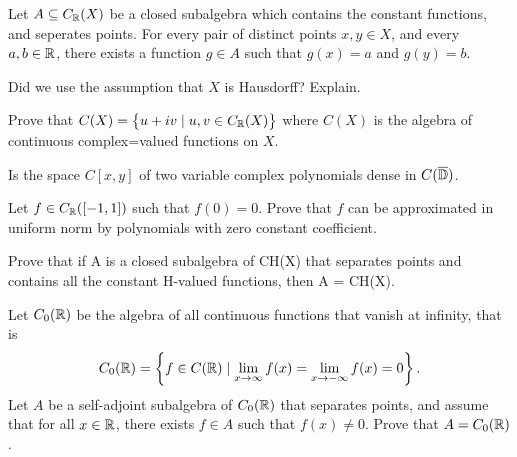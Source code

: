 \documentclass[11pt,a4paper]{article}
\begin{document}
\begin{exercise}
  Let $A \subseteq C_{\mathbb{R}}(X)$ be a closed subalgebra which contains the
  constant functions, and seperates points.
  For every pair of distinct points $x, y \in X$,
  and every $a, b \in \mathbb{R}$,
  there exists a function $g \in A$ such that $g(x) = a$ and $g(y) = b$.
\end{exercise}
\begin{solution}

\end{solution}

\begin{exercise}
  Did we use the assumption that $X$ is Hausdorff? Explain.
\end{exercise}
\begin{solution}
  
\end{solution}

\begin{exercise}
  Prove that $C(X) = \left\{u +iv \mid u,v \in C_{\mathbb{R}}(X)\right\}$
  where $C(X)$ is the algebra of continuous complex=valued functions on $X$.
\end{exercise}
\begin{solution}

\end{solution}

\begin{exercise}
  Is the space $C[x,y]$ of two variable complex polynomials dense in
  $C(\overline {\mathbb{D}})$.
\end{exercise}
\begin{solution}

\end{solution}

\begin{exercise}
  Let $f \in C_{\mathbb{R}}([-1, 1])$ such that $f(0) = 0$.
  Prove that $f$ can be approximated in uniform norm by
  polynomials with zero constant coefficient.
\end{exercise}
\begin{solution}

\end{solution}Prove that if A is a closed subalgebra of CH(X)
that separates points and contains all the constant H-valued functions, then A = CH(X).

\begin{exercise}
  Let $C_0(\mathbb{R})$ be the algebra of all continuous functions that vanish
  at infinity, that is
  \[
    C_0(\mathbb{R}) = \left\{f \in C(\mathbb{R}) \mid
        \lim_{x \to \infty} f(x) = \lim_{x \to -\infty} f(x) = 0\right\}.
  \]
  Let $A$ be a self-adjoint subalgebra of $C_0(\mathbb{R})$ that separates points,
  and assume that for all $x \in \mathbb{R}$,
  there exists $f \in A$ such that $f(x) \neq 0$.
  Prove that $A = C_0(\mathbb{R})$.
\end{exercise}
\begin{solution}

\end{solution}
\end{document}
